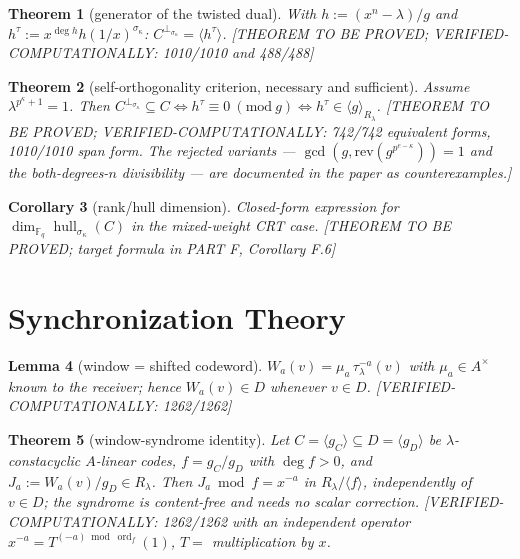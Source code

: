 \documentclass[11pt]{article}
\newtheorem{theorem}{Theorem}[section]
\newtheorem{lemma}[theorem]{Lemma}
\newtheorem{corollary}[theorem]{Corollary}
\theoremstyle{definition}
\theoremstyle{remark}
\theoremstyle{plain}
\newcommand{\Fq}{\mathbb{F}_q}
\newcommand{\Aalg}{A}
\newcommand{\Rlam}{R_{\lambda}}
\newcommand{\hull}{\operatorname{hull}}
\newcommand{\ord}{\operatorname{ord}}
\newcommand{\perpsig}{^{\perp_{\sigma_\kappa}}}
\begin{document}
\begin{theorem}[generator of the twisted dual]\label{thm:dualgen}
With $h:=(x^n-\lambda)/g$ and $h^\tau:=x^{\deg h}h(1/x)^{\sigma_\kappa}$:
$C\perpsig=\langle h^\tau\rangle$.
\textnormal{[THEOREM TO BE PROVED; VERIFIED-COMPUTATIONALLY: 1010/1010 and 488/488]}
\end{theorem}

\begin{theorem}[self-orthogonality criterion, necessary and sufficient]\label{thm:contain}
Assume $\lambda^{p^\kappa+1}=1$. Then
$C\perpsig\subseteq C\iff h^\tau\equiv0\ (\mathrm{mod}\ g)
\iff h^\tau\in\langle g\rangle_{\Rlam}$.
\textnormal{[THEOREM TO BE PROVED; VERIFIED-COMPUTATIONALLY: 742/742 equivalent forms,
1010/1010 span form.  The rejected variants --- $\gcd(g,\mathrm{rev}(g^{p^{e-\kappa}}))=1$
and the both-degrees-$n$ divisibility --- are documented in the paper as counterexamples.]}
\end{theorem}

\begin{corollary}[rank/hull dimension]\label{cor:hull}
Closed-form expression for $\dim_{\Fq}\hull_{\sigma_\kappa}(C)$ in the mixed-weight CRT
case. \textnormal{[THEOREM TO BE PROVED; target formula in PART F, Corollary F.6]}
\end{corollary}

\section{Synchronization Theory}\label{sec:sync}

\begin{lemma}[window = shifted codeword]\label{lem:window}
$W_a(v)=\mu_a\,\tau_\lambda^{-a}(v)$ with $\mu_a\in\Aalg^\times$ known to the receiver;
hence $W_a(v)\in D$ whenever $v\in D$.
\textnormal{[VERIFIED-COMPUTATIONALLY: 1262/1262]}
\end{lemma}

\begin{theorem}[window-syndrome identity]\label{thm:syndrome}
Let $C=\langle g_C\rangle\subseteq D=\langle g_D\rangle$ be $\lambda$-constacyclic
$\Aalg$-linear codes, $f=g_C/g_D$ with $\deg f>0$, and $J_a:=W_a(v)/g_D\in\Rlam$.
Then $J_a\bmod f=x^{-a}$ in $\Rlam/\langle f\rangle$, independently of $v\in D$;
the syndrome is content-free and needs no scalar correction.
\textnormal{[VERIFIED-COMPUTATIONALLY: 1262/1262 with an independent operator
$x^{-a}=T^{(-a)\bmod\ord_f}(1)$, $T=$ multiplication by $x$.}
\end{theorem}
\end{document}
